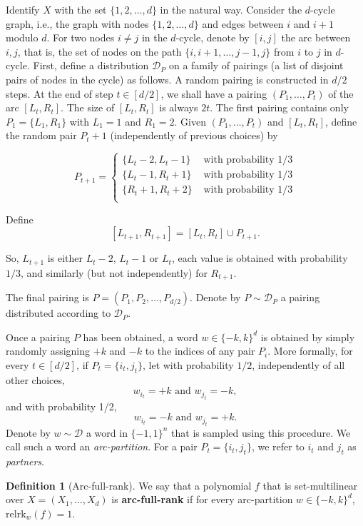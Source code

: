 \documentclass[10pt,a4paper]{article}
\theoremstyle{definition}%
\newtheorem{definition}[theorem]{Definition}
\theoremstyle{plain}
\newcommand{\rk}{\mathrm{relrk}}
\newcommand{\calD}{\mathcal{D}}
\begin{document}
Identify $X$ with the set $\{1, 2,\ldots, d\}$ in the natural way. Consider the $d$-cycle
graph, i.e., the graph with nodes $\{1, 2,\ldots, d\}$ and edges between $i$ and $i + 1$ modulo $d$. For
two nodes $i \neq j$ in the $d$-cycle, denote by $[i, j]$ the arc between $i, j$, that is, the set of nodes on the
path $\{i, i + 1, \ldots , j - 1, j\}$ from $i$ to $j$ in $d$-cycle.
First, define a distribution $\calD_P$ on a family of pairings (a list of disjoint pairs of nodes in the
cycle) as follows. A random pairing is constructed in $d/2$ steps. At the end of step $t \in [d/2]$, we
shall have a pairing $(P_1,\ldots , P_t)$ of the arc $[L_t, R_t]$. The size of $[L_t
, R_t]$ is always $2t$. The first pairing
contains only $P_1 = \{L_1, R_1\}$ with $L_1 = 1$ and $R_1 = 2$. Given $(P_1, \ldots, P_t)$ and $[L_t, R_t]$, define the
random pair $P_t+1$ (independently of previous choices) by 

$$
P_{t+1} = \begin{cases}
    \{L_t - 2, L_t - 1\} &\text{ with probability $1/3$}\\
    \{L_t - 1, R_t + 1\} &\text{ with probability $1/3$}\\
    \{R_t + 1, R_t + 2\} &\text{ with probability $1/3$}\\
\end{cases}
$$

Define
$$
[L_{t+1},R_{t+1}] = [L_t,R_t] \cup P_{t+1}.
$$

So, $L_{t+1}$ is either $L_t - 2$, $L_t - 1$ or $L_t$, each value is obtained with probability $1/3$, and similarly
(but not independently) for $R_{t+1}$.

The final pairing is
$P = (P_1, P_2, \ldots , P_{d/2}
)$.
Denote by $P \sim \calD_P$ a pairing distributed according to $\calD_P$.

Once a pairing $P$ has been obtained, a word $w\in \{-k,k\}^d$ is obtained by simply randomly assigning $+k$ and $-k$ to the indices of any pair $P_i$. More formally, for every
$t \in [d/2]$, if $P_t = \{i_t
, j_t\}$, let with probability $1/2$, independently of all other choices,
$$
w_{i_t} = +k \text{ and } w_{j_t} = -k,
$$
and with probability 1/2,
$$
w_{i_t} = -k \text{ and } w_{j_t} = +k.
$$
Denote by $w\sim \calD$ a word in $\{-1,1\}^n$ that is sampled using this procedure. We call such a word an \emph{arc-partition}. For a pair $P_t = \{i_t,j_t\}$, we refer to $i_t$ and $j_t$ as \emph{partners}. 

\begin{definition}[Arc-full-rank]\label{def:arc-full-rk}
We say that a polynomial $f$ that is set-multilinear over $X = (X_1, \ldots, X_{d})$ is \textbf{arc-full-rank} if for every arc-partition $w\in \{-k,k\}^d$, $\rk_w(f) = 1$.
\end{definition}
\end{document}
